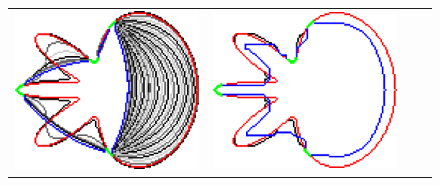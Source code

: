 \begin{figure}
\begin{tabular}{cccc}
\includegraphics[scale=0.2]{figures/chapter9/constrained-elastica/graphflow/flower-1/len_pen-0.0002/radius-7/N-1/h1.0/summary.pdf} &
\includegraphics[scale=0.2]{figures/chapter9/constrained-elastica/graphflow/flower-1/len_pen-0.0002/radius-50/N-1/h1.0/summary.pdf}\\


\end{tabular}
\end{figure}
